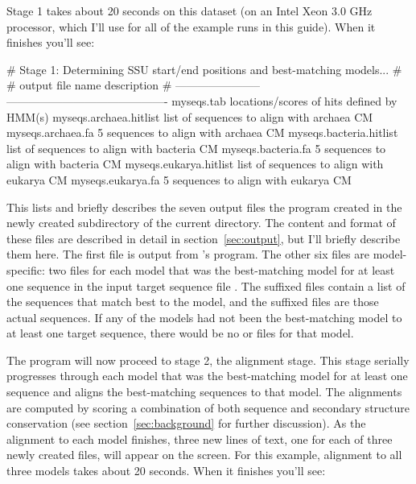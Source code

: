 Stage 1 takes about 20 seconds on this dataset (on an Intel Xeon 3.0
GHz processor, which I'll use for all of the example runs in this
guide). When it finishes you'll see: 

\begin{sreoutput}
# Stage 1: Determining SSU start/end positions and best-matching models...
#
# output file name         description                                
# -----------------------  -------------------------------------------
  myseqs.tab               locations/scores of hits defined by HMM(s)
  myseqs.archaea.hitlist   list of sequences to align with archaea CM
  myseqs.archaea.fa              5 sequences to align with archaea CM
  myseqs.bacteria.hitlist  list of sequences to align with bacteria CM
  myseqs.bacteria.fa             5 sequences to align with bacteria CM
  myseqs.eukarya.hitlist   list of sequences to align with eukarya CM
  myseqs.eukarya.fa              5 sequences to align with eukarya CM
\end{sreoutput}

This lists and briefly describes the seven output files the program created
in the newly created  subdirectory of the current directory.
The content and format of these files are described
in detail in section~\ref{sec:output}, but I'll briefly describe them 
here. The first file  is output from
's  program. The other six files are
model-specific: two files for each model that was the best-matching
model for at least one sequence in the input target sequence file
. The  suffixed files contain a list
of the sequences that match best to the model, and the 
suffixed files are those actual sequences. If any of the models had
not been the best-matching model to at least one target sequence,
there would be no  or  files for that
model.

The program will now proceed to stage 2, the alignment stage. This
stage serially progresses through each model that was the
best-matching model for at least one sequence and aligns the
best-matching sequences to that model. The alignments are computed by
scoring a combination of both sequence and secondary structure
conservation (see section~\ref{sec:background} for further
discussion). 
As the alignment to each model finishes, three new lines
of text, one for each of three newly created files, will appear on the
screen. For this example, alignment to all three models takes about 20
seconds. When it finishes you'll see:

